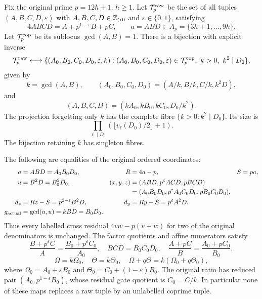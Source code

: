 \begin{theorem}
\label{thm:raw-scale-fibre}
Fix the original prime \(p=12h+1\), \(h\ge1\).
Let \(\mathcal T_p^{\rm raw}\) be the set of all tuples
\((A,B,C,D,\varepsilon)\) with \(A,B,C,D\in\mathbb Z_{>0}\) and
\(\varepsilon\in\{0,1\}\), satisfying
\[
 4ABCD=A+p^{1-\varepsilon}B+pC,
 \qquad a=ABD\in A_p=\{3h+1,\ldots,9h\}.
\]
Let \(\mathcal T_p^{\rm cop}\) be its sublocus \(\gcd(A,B)=1\).
There is a bijection with explicit inverse
\[
 \mathcal T_p^{\rm raw}\longleftrightarrow
 \{(A_0,B_0,C_0,D_0,\varepsilon,k):
       (A_0,B_0,C_0,D_0,\varepsilon)\in\mathcal T_p^{\rm cop},
       \ k>0,\ k^2\mid D_0\},
\]
given by
\[
 k=\gcd(A,B),\qquad
 (A_0,B_0,C_0,D_0)=(A/k,B/k,C/k,k^2D),
\]
and
\[
 (A,B,C,D)=(kA_0,kB_0,kC_0,D_0/k^2).
\]
The projection forgetting only \(k\) has the complete fibre
\(\{k>0:k^2\mid D_0\}\). Its size is
\[
 \prod_{\ell\mid D_0}(\lfloor v_\ell(D_0)/2\rfloor+1).
\]
The bijection retaining \(k\) has singleton fibres.

The following are equalities of the original ordered coordinates:
\begin{align*}
 a&=ABD=A_0B_0D_0,& R&=4a-p,&S&=pa,\\
 u&=B^2D=B_0^2D_0,&
 (x,y,z)&=(ABD,p^\varepsilon ACD,pBCD)\\
 &&&=(A_0B_0D_0,p^\varepsilon A_0C_0D_0,pB_0C_0D_0),\\
 d_z&=Rz-S=p^{2-\varepsilon}B^2D,
 &d_y&=Ry-S=p^\varepsilon A^2D,\\
 g_{\rm actual}&=\gcd(a,u)=kBD=B_0D_0.
\end{align*}
Thus every labelled cross residual \(4vw-p(v+w)\) for two
of the original denominators is unchanged.  The factor quotients
and affine numerators satisfy
\[
 \frac{B+p^\varepsilon C}{A}
   =\frac{B_0+p^\varepsilon C_0}{A_0},\quad
 BCD=B_0C_0D_0,\quad
 \frac{A+pC}{B}=\frac{A_0+pC_0}{B_0},
\]
\[
 \Omega=k\Omega_0,\quad\Theta=k\Theta_0,
 \quad \Omega+q\Theta=k(\Omega_0+q\Theta_0),
\]
where \(\Omega_0=A_0+\varepsilon B_0\) and
\(\Theta_0=C_0+(1-\varepsilon)B_0\).
The original ratio has reduced pair
\((A_0,p^{1-\varepsilon}B_0)\), whose residual gate quotient is
\(C_0=C/k\).  In particular none of these maps replaces a raw
tuple by an unlabelled coprime tuple.
\end{theorem}
